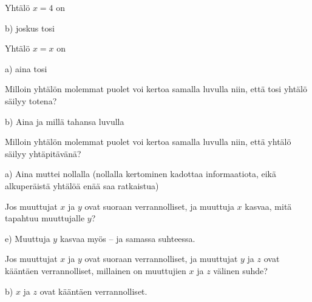 \begin{tehtava}
Yhtälö $x = 4$ on
\begin{vastaus}
b) joskus tosi
\end{vastaus}
\end{tehtava}

\begin{tehtava}
Yhtälö $x = x$ on
\begin{vastaus}
a) aina tosi
\end{vastaus}
\end{tehtava}

\begin{tehtava}
Milloin yhtälön molemmat puolet voi kertoa samalla luvulla niin, että tosi yhtälö säilyy totena?
	\begin{vastaus}
b) Aina ja millä tahansa luvulla
	\end{vastaus}
\end{tehtava}

\begin{tehtava}
Milloin yhtälön molemmat puolet voi kertoa samalla luvulla niin, että yhtälö säilyy yhtäpitävänä?
\begin{vastaus}
a) Aina muttei nollalla (nollalla kertominen kadottaa informaatiota, eikä alkuperäistä yhtälöä enää saa ratkaistua)
\end{vastaus}
\end{tehtava}

\begin{tehtava}
Jos muuttujat $x$ ja $y$ ovat suoraan verrannolliset, ja muuttuja $x$ kasvaa, mitä tapahtuu muuttujalle $y$?
\begin{vastaus}
e) Muuttuja $y$ kasvaa myös -- ja samassa suhteessa.
\end{vastaus}
\end{tehtava}

\begin{tehtava}
Jos muuttujat $x$ ja $y$ ovat suoraan verrannolliset, ja muuttujat $y$ ja $z$ ovat kääntäen verrannolliset, millainen on muuttujien $x$ ja $z$ välinen suhde?
	\begin{vastaus}
b) $x$ ja $z$ ovat kääntäen verrannolliset.
	\end{vastaus}
\end{tehtava}

